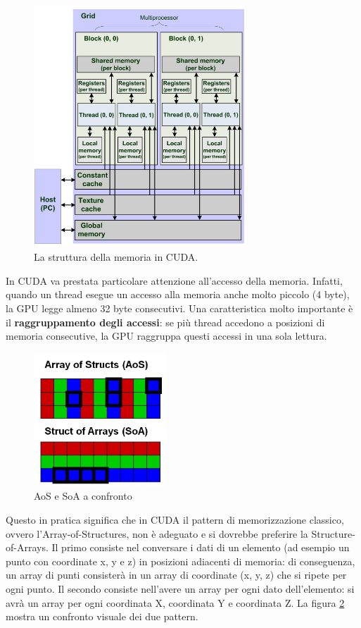 \documentclass[12pt,a4paper,openright,twoside]{report}
\newcommand{\source}[1]{\caption*{\hfill \scriptsize Fonte: {#1}} }
\begin{document}
\begin{figure}[h]
    \centering
    \includegraphics[width=8cm]{cuda-memory-hierarchy.jpg}
    \source{\url{https://www.researchgate.net/figure/Memory-model-CUDA-memory-hierarchy_fig2_51529494}}
    \caption{La struttura della memoria in CUDA.}
    \label{img:memory-hierarchy}
\end{figure}

In CUDA va prestata particolare attenzione all'accesso della memoria. Infatti, quando un thread esegue un accesso alla memoria anche molto piccolo (4 byte), la GPU legge almeno 32 byte consecutivi. Una caratteristica molto importante è il \textbf{raggruppamento degli accessi}: se più thread accedono a posizioni di memoria consecutive, la GPU raggruppa questi accessi in una sola lettura.

\begin{figure}
    \centering
    \includegraphics[width=5cm]{aos.jpg}
    \source{\url{https://asc.ziti.uni-heidelberg.de/en/node/18}}
    \caption{AoS e SoA a confronto}
    \label{img:aos}
\end{figure}

Questo in pratica significa che in CUDA il pattern di memorizzazione classico, ovvero l'Array-of-Structures, non è adeguato e si dovrebbe preferire la Structure-of-Arrays. Il primo consiste nel conversare i dati di un elemento (ad esempio un punto con coordinate x, y e z) in posizioni adiacenti di memoria: di conseguenza, un array di punti consisterà in un array di coordinate (x, y, z) che si ripete per ogni punto. Il secondo consiste nell'avere un array per ogni dato dell'elemento: si avrà un array per ogni coordinata X, coordinata Y e coordinata Z. La figura \ref{img:aos} mostra un confronto visuale dei due pattern.
\end{document}
